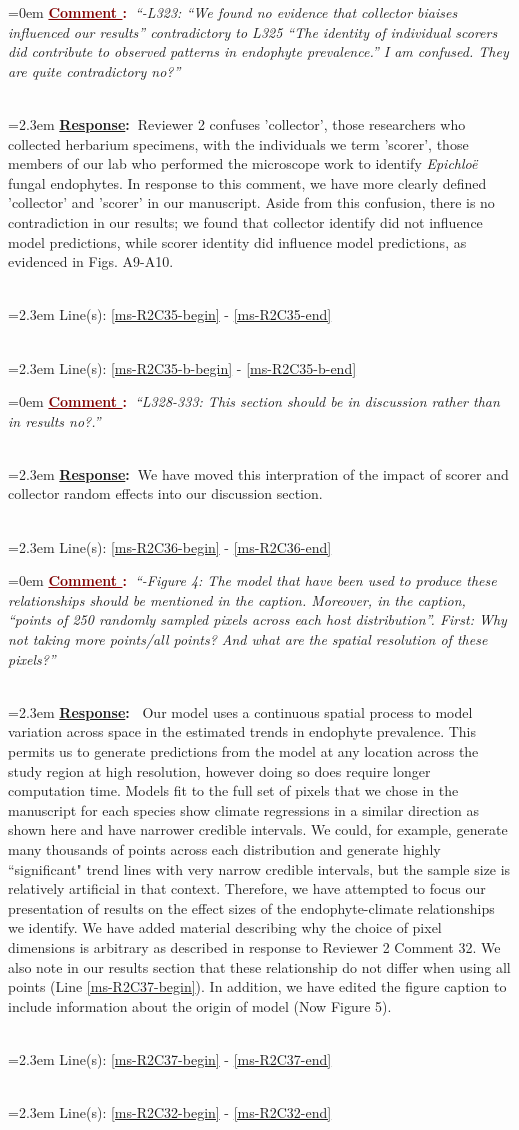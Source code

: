 \documentclass[12pt]{article}
\newcounter{cN}
\newcommand{\comment}[1]{
	\vspace{2em}
	\refstepcounter{cN} %
	\noindent \hangindent=0em \textbf{\textcolor{Maroon}{\uline{Comment \thecN}:~}}\emph{``#1''}
	}
\newcommand{\response}[1]{
	\\[0.25em]
	\hangindent=2.3em \textbf{\textcolor{NavyBlue}{\uline{Response}:~}}#1
	}
\newcommand{\linesref}[2]{
		\\[0.25em]
	\hangindent=2.3em {\color{Mahogany} Line(s): \ref{#1} - \ref{#2}}
}
\begin{document}
\comment{-L323: “We found no evidence that collector biaises influenced our results” contradictory to L325 “The identity of individual scorers did contribute to observed patterns in endophyte prevalence.” I am confused. They are quite contradictory no?}
\response{Reviewer 2 confuses 'collector', those researchers who collected herbarium specimens, with the individuals we term 'scorer', those members of our lab who performed the microscope work to identify \emph{Epichloë} fungal endophytes. 
In response to this comment, we have more clearly defined 'collector' and 'scorer' in our manuscript.
Aside from this confusion, there is no contradiction in our results; we found that collector identify did not influence model predictions, while scorer identity did influence model predictions, as evidenced in Figs. A9-A10. }
\linesref{ms-R2C35-begin}{ms-R2C35-end}
\linesref{ms-R2C35-b-begin}{ms-R2C35-b-end}


\comment{L328-333: This section should be in discussion rather than in results no?.}
\response{We have moved this interpration of the impact of scorer and collector random effects into our discussion section.}
\linesref{ms-R2C36-begin}{ms-R2C36-end}


\comment{-Figure 4: The model that have been used to produce these relationships should be mentioned in the caption. Moreover, in the caption, “points of 250 randomly sampled pixels across each host distribution”. First: Why not taking more points/all points? And what are the spatial resolution of these pixels?}
\response{ Our model uses a continuous spatial process to model variation across space in the estimated trends in endophyte prevalence. This permits us to generate predictions from the model at any location across the study region at high resolution, however doing so does require longer computation time. Models fit to the full set of pixels that we chose in the manuscript for each species show climate regressions in a similar direction as shown here and have narrower credible intervals. We could, for example, generate many thousands of points across each distribution and generate highly ``significant" trend lines with very narrow credible intervals, but the sample size is relatively artificial in that context. Therefore, we have attempted to focus our presentation of results on the effect sizes of the endophyte-climate relationships we identify. We have added material describing why the choice of pixel dimensions is arbitrary as described in response to Reviewer 2 Comment 32. We also note in our results section that these relationship do not differ when using all points (Line \ref{ms-R2C37-begin}). In addition, we have edited the figure caption to include information about the origin of model (Now Figure 5).}
\linesref{ms-R2C37-begin}{ms-R2C37-end}
\linesref{ms-R2C32-begin}{ms-R2C32-end}
\end{document}
